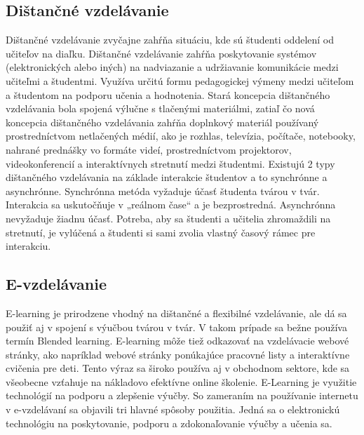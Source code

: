 \documentclass[10pt,oneside,slovak,a4paper]{article}
\begin{document}
\subsection{Dištančné vzdelávanie}
Dištančné vzdelávanie zvyčajne zahŕňa situáciu, kde sú študenti oddelení od učiteľov na diaľku. Dištančné vzdelávanie zahŕňa poskytovanie systémov (elektronických alebo iných) na nadviazanie a udržiavanie komunikácie medzi učiteľmi a študentmi. Využíva určitú formu pedagogickej výmeny  medzi učiteľom a študentom na podporu učenia a hodnotenia.
Stará koncepcia dištančného vzdelávania bola spojená výlučne s tlačenými materiálmi, zatiaľ čo nová koncepcia dištančného vzdelávania zahŕňa doplnkový materiál používaný prostredníctvom netlačených médií, ako je rozhlas, televízia, počítače, notebooky, nahrané prednášky vo formáte videí, prostredníctvom projektorov, videokonferencií a interaktívnych stretnutí medzi študentmi.
Existujú 2 typy dištančného vzdelávania na základe interakcie študentov a to synchrónne a asynchrónne. Synchrónna metóda vyžaduje účasť študenta tvárou v tvár. Interakcia sa uskutočňuje v „reálnom čase“ a je bezprostredná. Asynchrónna nevyžaduje žiadnu účasť. Potreba, aby sa študenti a učitelia zhromaždili na stretnutí, je vylúčená a študenti si sami zvolia vlastný časový rámec pre interakciu. \cite{India}
\subsection{E-vzdelávanie}
E-learning je prirodzene vhodný na dištančné a flexibilné vzdelávanie, ale dá sa použiť aj v spojení s výučbou tvárou v tvár. V takom prípade sa bežne používa termín Blended learning. E-learning môže tiež odkazovať na vzdelávacie webové stránky, ako napríklad webové stránky ponúkajúce pracovné listy a interaktívne cvičenia pre deti. Tento výraz sa široko používa aj v obchodnom sektore, kde sa všeobecne vzťahuje na nákladovo efektívne online školenie. E-Learning je využitie technológií na podporu a zlepšenie výučby. So zameraním na používanie internetu v e-vzdelávaní sa objavili tri hlavné spôsoby použitia. Jedná sa o elektronickú technológiu na poskytovanie, podporu a zdokonaľovanie výučby a učenia sa.\cite{elearningDef}
\end{document}
